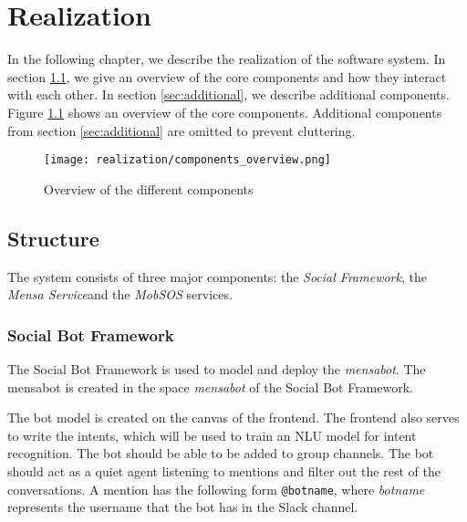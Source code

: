 \chapter{Realization}
In the following chapter, we describe the realization of the software system. In section \ref{sec:structure}, we give an overview of the core components and how they interact with each other. 
In section \ref{sec:additional}, we describe additional components. Figure \ref{fig:componentsOverview} shows an overview of the core components. Additional components from section \ref{sec:additional} are omitted to prevent cluttering.

\begin{figure}[h]
    \centering
    \texttt{[image: realization/components\_overview.png]}
    \caption{Overview of the different components}
    \label{fig:componentsOverview}
\end{figure}

\section{Structure}\label{sec:structure}
The system consists of three major components: the \emph{Social Framework}, the \emph{Mensa Service}\footnotemark and the \emph{MobSOS} services. 
\subsection{Social Bot Framework}
The Social Bot Framework is used to model and deploy the \emph{mensabot}. The mensabot is created in the space \emph{mensabot} of the Social Bot Framework.

The bot model is created on the canvas of the frontend. 
The frontend also serves to write the intents, which will be used to train an NLU model for intent recognition. 
The bot should be able to be added to group channels. The bot should act as a quiet agent listening to mentions and filter out the rest of the conversations.
A mention has the following form \texttt{@botname}, where \emph{botname} represents the username that the bot has in the Slack channel.


